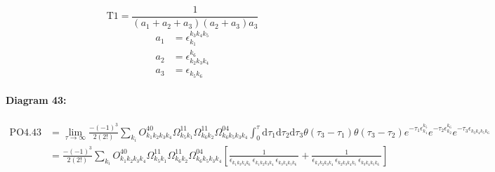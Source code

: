 \documentclass[10pt,a4paper]{article}
\begin{document}
\begin{equation}
\text{T}1 = \frac{1}{(a_1+ a_2+ a_3)(a_2+ a_3)a_3}\end{equation}
\begin{align*}
a_1 &= \epsilon^{k_{3}k_{4}k_{5}}_{k_{1}}\\
a_2 &= \epsilon^{k_{6}}_{k_{2}k_{3}k_{4}}\\
a_3 &= \epsilon^{}_{k_{5}k_{6}}
\end{align*}
\paragraph{Diagram 43:}
\begin{align}
\text{PO}4.43
&= \lim\limits_{\tau \to \infty}\frac{-(-1)^3 }{2(2!)}\sum_{k_i}O^{40}_{k_{1}k_{2}k_{3}k_{4}} \Omega^{11}_{k_{5}k_{1}} \Omega^{11}_{k_{6}k_{2}} \Omega^{04}_{k_{6}k_{5}k_{3}k_{4}} \int_{0}^{\tau}\mathrm{d}\tau_1\mathrm{d}\tau_2\mathrm{d}\tau_3\theta(\tau_3-\tau_1) \theta(\tau_3-\tau_2) e^{-\tau_1 \epsilon^{k_{5}}_{k_{1}}}e^{-\tau_2 \epsilon^{k_{6}}_{k_{2}}}e^{-\tau_3 \epsilon^{}_{k_{3}k_{4}k_{5}k_{6}}}
 \nonumber \\
&= \frac{-(-1)^3 }{2(2!)}\sum_{k_i}O^{40}_{k_{1}k_{2}k_{3}k_{4}} \Omega^{11}_{k_{5}k_{1}} \Omega^{11}_{k_{6}k_{2}} \Omega^{04}_{k_{6}k_{5}k_{3}k_{4}} \left[\frac{1}{\epsilon^{}_{k_{1}k_{3}k_{4}k_{6}}\ \epsilon^{}_{k_{1}k_{2}k_{3}k_{4}}\ \epsilon^{}_{k_{3}k_{4}k_{5}k_{6}}\ } + \frac{1}{\epsilon^{}_{k_{1}k_{2}k_{3}k_{4}}\ \epsilon^{}_{k_{2}k_{3}k_{4}k_{5}}\ \epsilon^{}_{k_{3}k_{4}k_{5}k_{6}}\ } \right]
\end{align}
\end{document}
